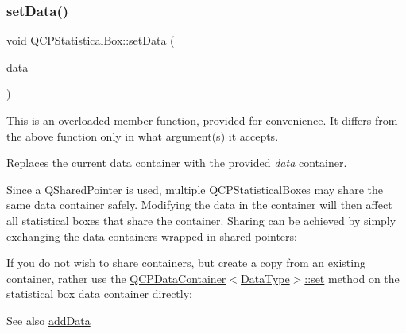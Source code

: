 \subsubsection{\texorpdfstring{set\+Data()}{setData()}\hspace{0.1cm}{\footnotesize\ttfamily [1/2]}}
{\footnotesize\ttfamily void Q\+C\+P\+Statistical\+Box\+::set\+Data (\begin{DoxyParamCaption}\item[{Q\+Shared\+Pointer$<$ \hyperlink{qcustomplot_8h_a8b773c0c35f8f924701ced6e9915e4c7}{Q\+C\+P\+Statistical\+Box\+Data\+Container} $>$}]{data }\end{DoxyParamCaption})}

This is an overloaded member function, provided for convenience. It differs from the above function only in what argument(s) it accepts.

Replaces the current data container with the provided {\itshape data} container.

Since a Q\+Shared\+Pointer is used, multiple Q\+C\+P\+Statistical\+Boxes may share the same data container safely. Modifying the data in the container will then affect all statistical boxes that share the container. Sharing can be achieved by simply exchanging the data containers wrapped in shared pointers\+: 
\begin{DoxyCodeInclude}
\end{DoxyCodeInclude}
 If you do not wish to share containers, but create a copy from an existing container, rather use the \hyperlink{class_q_c_p_data_container_ae7042bd534fc3ce7befa2ce3f790b5bf}{Q\+C\+P\+Data\+Container$<$\+Data\+Type$>$\+::set} method on the statistical box data container directly\+: 
\begin{DoxyCodeInclude}
\end{DoxyCodeInclude}
 \begin{DoxySeeAlso}{See also}
\hyperlink{class_q_c_p_statistical_box_a9a8739c5b8291db8fd839e892fc8f478}{add\+Data} 
\end{DoxySeeAlso}
\mbox{\label{class_q_c_p_statistical_box_a4ae198e66243d8cc57ad8893c37bf9d4}} 
